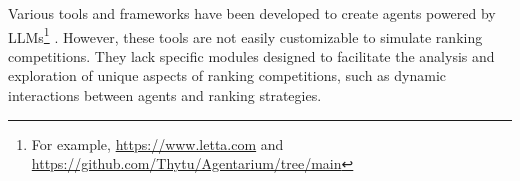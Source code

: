  Various tools and frameworks have been developed to create agents powered by LLMs\footnote{For example, \url{https://www.letta.com} and \url{https://github.com/Thytu/Agentarium/tree/main}} \cite{feng_agile_2024, qiao_taskweaver_2024, liu_agentlite_2024}. However, these tools are not easily customizable to simulate ranking competitions. They lack specific modules designed to facilitate the analysis and exploration of unique aspects of ranking competitions, such as dynamic interactions between agents and ranking strategies.
